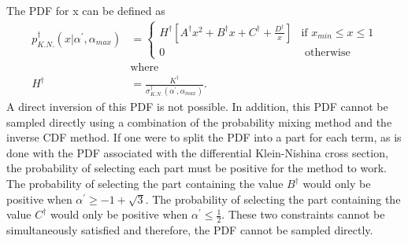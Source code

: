 The PDF for x can be defined as
\begin{align}
  p_{K.N.}^{\dagger}(x|\alpha^{'},\alpha_{max}) & = 
  \begin{cases}
    H^{\dagger}\left[A^{\dagger}x^2 + B^{\dagger}x + C^{\dagger} + \frac{D^{\dagger}}{x}
      \right] & \text{if } x_{min} \leq x \leq 1 \\
    0 & \text{ otherwise}
  \end{cases} 
  \label{eq:adjoint_incoherent_pdf_x} \\
  & \text{where} \nonumber \\
  H^{\dagger} & = \frac{K^{\dagger}}{\sigma_{K.N.}^{\dagger}(\alpha^{'},\alpha_{max})}.
  \nonumber 
\end{align}
A direct inversion of this PDF is not possible. In addition, this PDF cannot be
sampled directly using a combination of the probability mixing method and the
inverse CDF method. If one were to split the PDF into a part for each term, as
is done with the PDF associated with the differential Klein-Nishina cross
section, the probability of selecting each part must be positive for the method
to work. The probability of selecting the part containing the value $B^{\dagger}$
would only be positive when $\alpha^{'} \geq -1 + \sqrt{3}$. The probability of
selecting the part containing the value $C^{\dagger}$ would only be positive when
$\alpha^{'} \leq \frac{1}{2}$. These two constraints cannot be simultaneously
satisfied and therefore, the PDF cannot be sampled directly.

